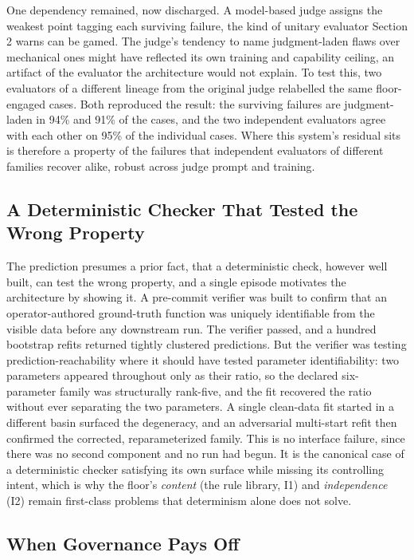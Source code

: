 \documentclass[11pt]{article}
\begin{document}
One dependency remained, now discharged. A model-based judge assigns the weakest point tagging each surviving failure, the kind of unitary evaluator Section 2 warns can be gamed. The judge's tendency to name judgment-laden flaws over mechanical ones might have reflected its own training and capability ceiling, an artifact of the evaluator the architecture would not explain. To test this, two evaluators of a different lineage from the original judge relabelled the same floor-engaged cases. Both reproduced the result: the surviving failures are judgment-laden in 94\% and 91\% of the cases, and the two independent evaluators agree with each other on 95\% of the individual cases. Where this system's residual sits is therefore a property of the failures that independent evaluators of different families recover alike, robust across judge prompt and training.

\subsection{A Deterministic Checker That Tested the Wrong Property}

The prediction presumes a prior fact, that a deterministic check, however well built, can test the wrong property, and a single episode motivates the architecture by showing it. A pre-commit verifier was built to confirm that an operator-authored ground-truth function was uniquely identifiable from the visible data before any downstream run. The verifier passed, and a hundred bootstrap refits returned tightly clustered predictions. But the verifier was testing prediction-reachability where it should have tested parameter identifiability: two parameters appeared throughout only as their ratio, so the declared six-parameter family was structurally rank-five, and the fit recovered the ratio without ever separating the two parameters. A single clean-data fit started in a different basin surfaced the degeneracy, and an adversarial multi-start refit then confirmed the corrected, reparameterized family. This is no interface failure, since there was no second component and no run had begun. It is the canonical case of a deterministic checker satisfying its own surface while missing its controlling intent, which is why the floor's \emph{content} (the rule library, I1) and \emph{independence} (I2) remain first-class problems that determinism alone does not solve.

\subsection{When Governance Pays Off}
\end{document}
